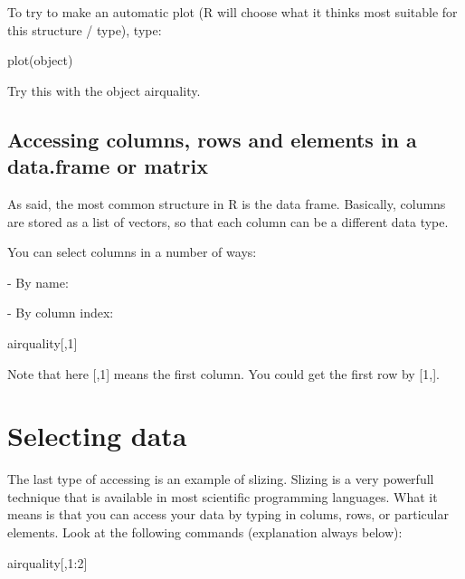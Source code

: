 \documentclass[a4paper,twoside]{tufte-book}\usepackage[]{graphicx}\usepackage[]{color}
\begin{document}
{\begin{appendices}
To try to make an automatic plot (R will choose what it thinks most suitable for this structure / type), type:

\begin{Schunk}
\begin{Sinput}
plot(object)
\end{Sinput}
\end{Schunk}

Try this with the object airquality. 

\subsection{Accessing columns, rows and elements in a data.frame or matrix}

As said, the most common structure in R is the data frame. Basically, columns are stored as a list of vectors, so that each column can be a different data type.

You can select columns in a number of ways:

- By name:
\begin{Schunk}
\end{Schunk}

- By column index: 

\begin{Schunk}
\begin{Sinput}
airquality[,1]
\end{Sinput}
\end{Schunk}

Note that here [,1] means the first column. You could get the first row by [1,].

\section{Selecting data}

The last type of accessing is an example of slizing. Slizing is a very powerfull technique that is available in most scientific programming languages. What it means is that you can access your data by typing in colums, rows, or particular elements. Look at the following commands (explanation always below):

\begin{Schunk}
\begin{Sinput}
airquality[,1:2]
\end{Sinput}
\end{Schunk}


\end{appendices}}
\end{document}
